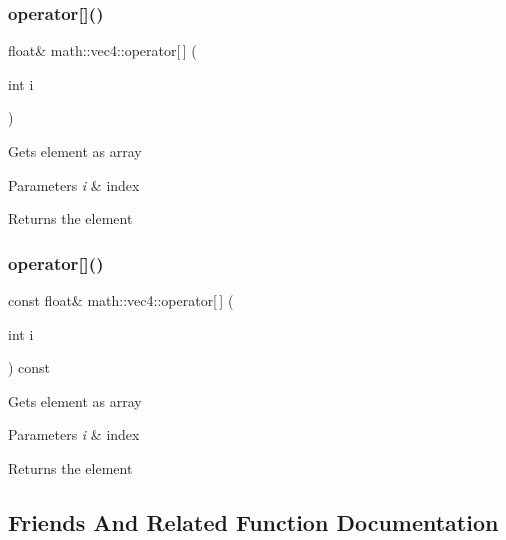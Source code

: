 \subsubsection{\texorpdfstring{operator[]()}{operator[]()}\hspace{0.1cm}{\footnotesize\ttfamily [1/2]}}
{\footnotesize\ttfamily float\& math\+::vec4\+::operator\mbox{[}$\,$\mbox{]} (\begin{DoxyParamCaption}\item[{int}]{i }\end{DoxyParamCaption})\hspace{0.3cm}{\ttfamily [inline]}}

Gets element as array 
\begin{DoxyParams}{Parameters}
{\em i} & index \\
\hline
\end{DoxyParams}
\begin{DoxyReturn}{Returns}
the element 
\end{DoxyReturn}
\mbox{\label{structmath_1_1vec4_a001a7e67abbd893ba55b74f43e31f554}} 
\subsubsection{\texorpdfstring{operator[]()}{operator[]()}\hspace{0.1cm}{\footnotesize\ttfamily [2/2]}}
{\footnotesize\ttfamily const float\& math\+::vec4\+::operator\mbox{[}$\,$\mbox{]} (\begin{DoxyParamCaption}\item[{int}]{i }\end{DoxyParamCaption}) const\hspace{0.3cm}{\ttfamily [inline]}}

Gets element as array 
\begin{DoxyParams}{Parameters}
{\em i} & index \\
\hline
\end{DoxyParams}
\begin{DoxyReturn}{Returns}
the element 
\end{DoxyReturn}


\subsection{Friends And Related Function Documentation}
\mbox{\label{structmath_1_1vec4_a1926ce7e95f766e792f64c9d7cc6f3f2}} 
